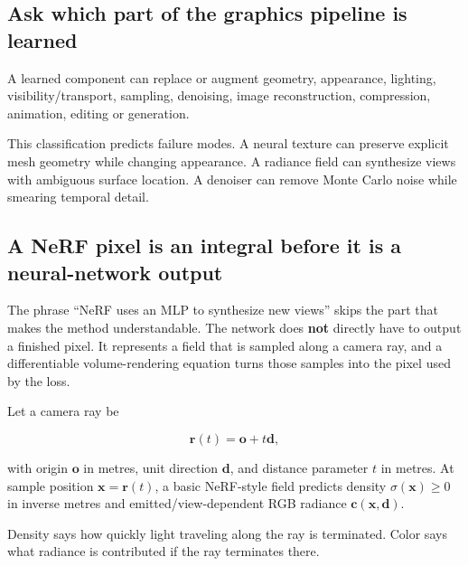 \subsection{Ask which part of the graphics pipeline is learned}\label{04-visual-computing-ii-ch035-ask-which-part-of-the-graphics-pipeline-is-learned}

\hypertarget{04-visual-computing-ii-ch035-ask-which-part-of-the-graphics-pipeline-is-learned}{}

A learned component can replace or augment geometry, appearance, lighting, visibility/transport, sampling, denoising, image reconstruction, compression, animation, editing or generation.

This classification predicts failure modes. A neural texture can preserve explicit mesh geometry while changing appearance. A radiance field can synthesize views with ambiguous surface location. A denoiser can remove Monte Carlo noise while smearing temporal detail.

\subsection{A NeRF pixel is an integral before it is a neural-network output}\label{04-visual-computing-ii-ch035-a-nerf-pixel-is-an-integral-before-it-is-a-neural-network-output}

\hypertarget{04-visual-computing-ii-ch035-a-nerf-pixel-is-an-integral-before-it-is-a-neural-network-output}{}

The phrase ``NeRF uses an MLP to synthesize new views'' skips the part that makes the method understandable. The network does \textbf{not} directly have to output a finished pixel. It represents a field that is sampled along a camera ray, and a differentiable volume-rendering equation turns those samples into the pixel used by the loss.

Let a camera ray be

\[\mathbf r(t)=\mathbf o+t\mathbf d,\]

with origin \(\mathbf o\) in metres, unit direction \(\mathbf d\), and distance parameter \(t\) in metres. At sample position \(\mathbf x=\mathbf r(t)\), a basic NeRF-style field predicts density \(\sigma(\mathbf x)\ge0\) in inverse metres and emitted/view-dependent RGB radiance \(\mathbf c(\mathbf x,\mathbf d)\).

Density says how quickly light traveling along the ray is terminated. Color says what radiance is contributed if the ray terminates there.

